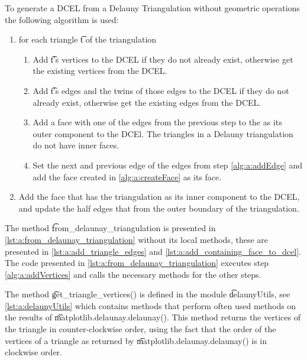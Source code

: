 	To generate a DCEL from a Delauny Triangulation without geometric operations the following algorithm is used:
		\begin{enumerate}
			\item \label{alg:a:forEachTriangle} for each triangle \t{t} of the triangulation
				\begin{enumerate}
					\item \label{alg:a:addVertices} Add \t{t}'s vertices to the DCEL if they do not already exist, otherwise get the existing vertices from the DCEL.
					\item \label{alg:a:addEdge} Add \t{t}'s edges and the twins of those edges to the DCEL if they do not already exist, otherwise get the existing edges from the DCEL.
					\item \label{alg:a:createFace} Add a face with one of the edges from the previous step to the as its outer component to the DCEl.  The triangles in a Delauny triangulation do not have inner faces.
					\item \label{alg:a:setEdges} Set the next and previous edge of the edges from step \ref{alg:a:addEdge} and add the face created in \ref{alg:a:createFace} as its face.
				\end{enumerate}
			\item \label{alg:a:addContainingFace} Add the face that has the triangulation as its inner component to the DCEL, and update the half edges that from the outer boundary of the triangulation.
		\end{enumerate}

	The method \t{from_delaunay_triangulation} is presented in \autoref{lst:a:from_delaunay_triangulation} without its local methods, these are presented in \autoref{lst:a:add_triangle_edges} and \autoref{lst:a:add_containing_face_to_dcel}. The code presented in \autoref{lst:a:from_delaunay_triangulation} executes step \ref{alg:a:addVertices} and calls the necessary methods for the other steps.

	

	The method \t{get_triangle_vertices()} is defined in the module \t{delaunyUtils}, see \autoref{lst:a:delaunyUtils} which contains methods that perform often used methods on the results of \t{matplotlib.delaunay.delaunay()}. This method returns the vertices of the triangle in counter-clockwise order, using the fact that the order of the vertices of a triangle as returned by \t{matplotlib.delaunay.delaunay()} is in clockwise order.

